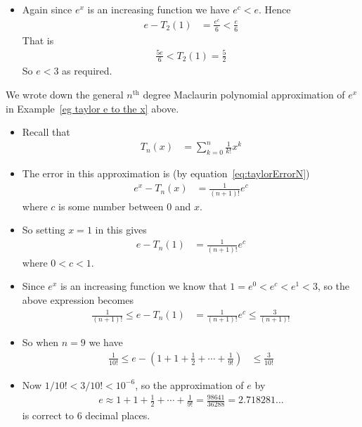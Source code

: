 \begin{eg}[Showing $e<3$]
\begin{itemize}
\item Again since $e^x$ is an increasing function we have $e^c < e$. Hence
\begin{align*}
  e - T_2(1) &= \frac{e^c}{6} < \frac{e}{6}
\end{align*}
That is
\begin{align*}
  \frac{5e}{6} < T_2(1) = \frac{5}{2}
\end{align*}
So $e<3$ as required.

\end{itemize}

\end{eg}



\begin{eg}[More on $e^x$]\label{eg:exp}
We wrote down the general $n^\mathrm{th}$ degree Maclaurin polynomial approximation of
$e^x$ in Example~\ref{eg taylor e to the x} above.
\begin{itemize}
 \item Recall that
\begin{align*}
  T_n(x) &= \sum_{k=0}^n \frac{1}{k!} x^k
\end{align*}
\item The error in this approximation is (by equation~\eqref{eq:taylorErrorN})
\begin{align*}
  e^x - T_n(x) &= \frac{1}{(n+1)!} e^c
\end{align*}
where $c$ is some number between $0$ and $x$.

\item So setting $x=1$ in this gives
\begin{align*}
  e - T_n(1) &= \frac{1}{(n+1)!} e^c
\end{align*}
where $0<c<1$.
\item Since $e^x$ is an increasing function we know that $1 = e^0 < e^c < e^1 < 3$, so
the above expression becomes
\begin{align*}
  \frac{1}{(n+1)!} \leq e - T_n(1) &= \frac{1}{(n+1)!} e^c \leq \frac{3}{(n+1)!}
\end{align*}
\item So when $n=9$ we have
\begin{align*}
  \frac{1}{10!} \leq e - \left(1 + 1 + \frac{1}{2} +\cdots + \frac{1}{9!} \right) &\leq
  \frac{3}{10!}
\end{align*}
\item Now $1/10! < 3/10! < 10^{-6}$, so the approximation of $e$ by
\begin{align*}
  e \approx 1 + 1 + \frac{1}{2} +\cdots + \frac{1}{9!} = \frac{98641}{36288} =
2.718281\dots
\end{align*}
is correct to 6 decimal places.


\end{itemize}
\end{eg}
